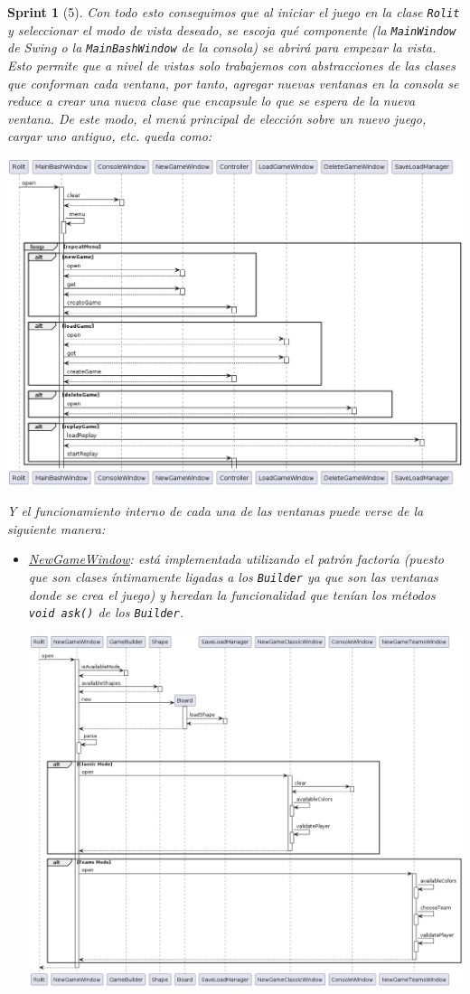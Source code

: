 \documentclass{article}
\theoremstyle{break}
\newtheorem*{sprint}{Sprint}
\begin{document}
\begin{sprint}[5]
Con todo esto conseguimos que al iniciar el juego en la clase \texttt{Rolit} y seleccionar el modo de vista deseado, se escoja qué componente (la \texttt{MainWindow} de \textit{Swing} o la \texttt{MainBashWindow} de la consola) se abrirá para empezar la vista. Esto permite que a nivel de vistas solo trabajemos con abstracciones de las clases que conforman cada ventana, por tanto, agregar nuevas ventanas en la consola se reduce a crear una nueva clase que encapsule lo que se espera de la nueva ventana. De este modo, el menú principal de elección sobre un nuevo juego, cargar uno antiguo, etc. queda como:
\begin{center}
\includegraphics[scale=0.40]{MenuPpal_sprint5_seq}
\end{center}
Y el funcionamiento interno de cada una de las ventanas puede verse de la siguiente manera:
\begin{itemize}
\item \underline{NewGameWindow}: está implementada utilizando el patrón factoría (puesto que son clases íntimamente ligadas a los \texttt{Builder} ya que son las ventanas donde se crea el juego) y heredan la funcionalidad que tenían los métodos \texttt{void ask()} de los \texttt{Builder}.
\begin{center}
\includegraphics[scale=0.40, angle=90]{NewGameWindow_sprint5_seq}

\end{center}
\end{itemize}
\end{sprint}
\end{document}
